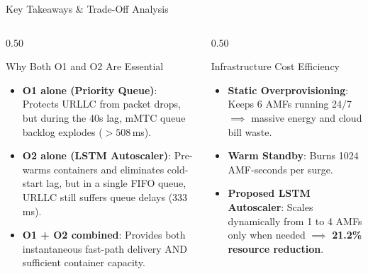 \documentclass[aspectratio=169,10pt]{beamer}
\begin{document}
\begin{frame}{Key Takeaways \& Trade-Off Analysis}
    \begin{columns}[T]
        \begin{column}{0.50\textwidth}
            \begin{block}{Why Both O1 and O2 Are Essential}
                \begin{itemize}
                    \item \textbf{O1 alone (Priority Queue)}: Protects URLLC from packet drops, but during the 40s lag, mMTC queue backlog explodes ($>508$\,ms).
                    \item \textbf{O2 alone (LSTM Autoscaler)}: Pre-warms containers and eliminates cold-start lag, but in a single FIFO queue, URLLC still suffers queue delays ($333$\,ms).
                    \item \textbf{O1 + O2 combined}: Provides both instantaneous fast-path delivery AND sufficient container capacity.
                \end{itemize}
            \end{block}
        \end{column}
        \begin{column}{0.50\textwidth}
            \begin{block}{Infrastructure Cost Efficiency}
                \begin{itemize}
                    \item \textbf{Static Overprovisioning}: Keeps 6 AMFs running 24/7 $\implies$ massive energy and cloud bill waste.
                    \item \textbf{Warm Standby}: Burns 1024 AMF-seconds per surge.
                    \item \textbf{Proposed LSTM Autoscaler}: Scales dynamically from 1 to 4 AMFs only when needed $\implies$ \textbf{21.2\% resource reduction}.
                \end{itemize}
            \end{block}
        \end{column}
    \end{columns}
\end{frame}
\end{document}
